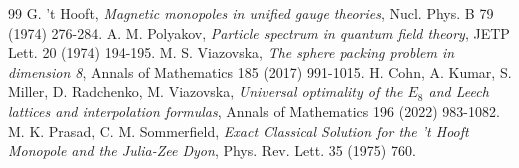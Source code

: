 \documentclass[11pt,a4paper]{article}
\begin{document}
\begin{thebibliography}{99}
 G. 't Hooft, \textit{Magnetic monopoles in unified gauge theories}, Nucl. Phys. B 79 (1974) 276-284.
 A. M. Polyakov, \textit{Particle spectrum in quantum field theory}, JETP Lett. 20 (1974) 194-195.
 M. S. Viazovska, \textit{The sphere packing problem in dimension 8}, Annals of Mathematics 185 (2017) 991-1015.
 H. Cohn, A. Kumar, S. Miller, D. Radchenko, M. Viazovska, \textit{Universal optimality of the $E_8$ and Leech lattices and interpolation formulas}, Annals of Mathematics 196 (2022) 983-1082.
 M. K. Prasad, C. M. Sommerfield, \textit{Exact Classical Solution for the 't Hooft Monopole and the Julia-Zee Dyon}, Phys. Rev. Lett. 35 (1975) 760.
\end{thebibliography}
\end{document}
